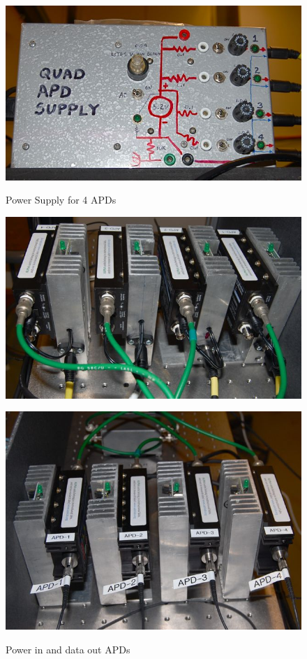 \documentclass{../lab}
\begin{document}
\noindent
\begin{figure}[H]
\captionsetup{justification=centering}
  \href{http://experimentationlab.berkeley.edu/sites/default/files/images/QIE1.jpg}{\includegraphics[width=\linewidth,keepaspectratio]{images/QIE1.jpg}}
  \caption{Power Supply for 4 APDs}
  \label{fig:QIE1.jpg}
\endminipage\hfill
{}
  \href{http://experimentationlab.berkeley.edu/sites/default/files/images/QIE4.jpg}{\includegraphics[width=\linewidth,keepaspectratio]{images/QIE4.jpg}}
  \caption{Power in and data out APDs}
  \label{fig:QIE4.jpg}
\endminipage\hfill
{}
  \href{http://experimentationlab.berkeley.edu/sites/default/files/images/QIE3.jpg}{\includegraphics[width=\linewidth,keepaspectratio]{images/QIE3.jpg}}

\end{figure}
\end{document}
